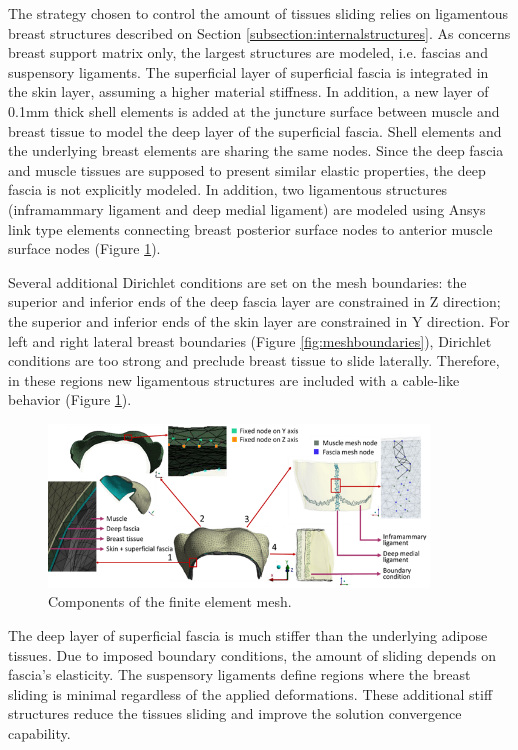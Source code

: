 The strategy chosen to control the amount of tissues sliding relies on ligamentous breast structures described on Section \ref{subsection:internalstructures}. As concerns breast support matrix only, the largest structures are modeled, i.e. fascias and suspensory ligaments.  The superficial layer of superficial fascia is integrated in the skin layer, assuming a higher material stiffness. In addition, a new layer of 0.1mm thick shell elements is added at the juncture surface between muscle and breast tissue to model the deep layer of the superficial fascia. Shell elements and the underlying breast elements are sharing the same nodes. Since the deep fascia and muscle tissues are supposed to present similar elastic properties, the deep fascia is not explicitly modeled. In addition, two ligamentous structures (inframammary ligament and deep medial ligament) are modeled using Ansys link type elements connecting breast posterior surface nodes to anterior muscle surface nodes (Figure \ref{fig:mesh_components_BC}).  


Several additional Dirichlet conditions are set on the mesh boundaries: the superior and inferior ends of the deep fascia layer are constrained in Z direction; the superior and inferior ends of the skin layer are constrained in Y direction. For left and right lateral breast boundaries (Figure \ref{fig:meshboundaries}), Dirichlet conditions are too strong and preclude breast tissue to slide laterally. Therefore, in these regions new ligamentous structures are included with a cable-like behavior (Figure \ref{fig:mesh_components_BC}).



\begin{figure}[!h]
\centering
\includegraphics[width=0.9\textwidth,keepaspectratio]{figures/mesh_components.png} 
\caption{Components of the finite element mesh.}\label{fig:mesh_components_BC}
\end{figure}

 The deep layer of superficial fascia is much stiffer than the underlying adipose tissues. Due to imposed boundary conditions, the amount of sliding depends on fascia's elasticity. The suspensory ligaments define regions where the breast sliding is minimal regardless of the applied deformations. These additional stiff structures reduce the tissues sliding and improve the solution convergence capability. 

